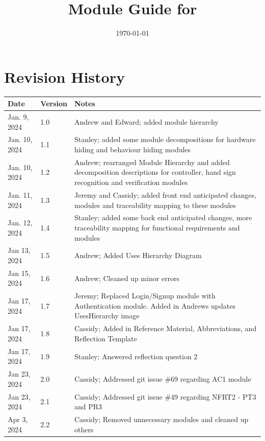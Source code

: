\documentclass[12pt, titlepage]{article}
\begin{document}
\title{Module Guide for \progname{}} 
\author{\authname}
\date{\today}

\maketitle


\section{Revision History}

\begin{tabularx}{\textwidth}{p{3cm}p{2cm}X}
\toprule {\bf Date} & {\bf Version} & {\bf Notes}\\
\midrule
Jan. 9, 2024 & 1.0 & Andrew and Edward; added module hierarchy\\
Jan. 10, 2024 & 1.1 & Stanley; added some module decompositions for hardware hiding and behaviour hiding modules\\
Jan. 10, 2024 & 1.2 & Andrew; rearranged Module Hierarchy and added decomposition descriptions for controller, hand sign recognition and verification modules\\
Jan. 11, 2024 & 1.3 & Jeremy and Cassidy; added front end anticipated changes, modules and traceability mapping to these modules\\
Jan. 12, 2024 & 1.4 & Stanley; added some back end anticipated changes, more traceability mapping for functional requirements and modules\\
Jan 13, 2024 & 1.5 & Andrew; Added Uses Hierarchy Diagram\\
Jan 15, 2024 & 1.6 & Andrew; Cleaned up minor errors\\
Jan 17, 2024 & 1.7 & Jeremy; Replaced Login/Signup module with Authentication module. Added in Andrews updates UsesHierarchy image\\
Jan 17, 2024 & 1.8 & Cassidy; Added in Reference Material, Abbreviations, and Reflection Template\\
Jan 17, 2024 & 1.9 & Stanley; Answered reflection question 2\\
Jan 23, 2024 & 2.0 & Cassidy; Addressed git issue \#69 regarding AC1 module \\
Jan 23, 2024 & 2.1 & Cassidy; Addressed git issue \#49 regarding NFRT2 - PT3 and PR3 \\
Apr 3, 2024 & 2.2 & Cassidy; Removed unnecessary modules and cleaned up others \\
\bottomrule
\end{tabularx}
\end{document}
